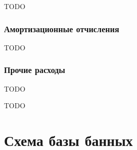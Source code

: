 \documentclass{mirea}
\begin{document}
TODO

\subsubsection{Амортизационные отчисления}

TODO

\subsubsection{Прочие расходы}

TODO


TODO



\begin{thebibliography}{99\kern\bibindent}
\end{thebibliography}



\appendix

\section{Схема базы банных}
\end{document}
